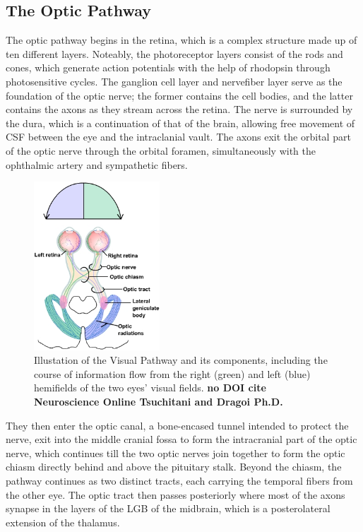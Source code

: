 \subsection{The Optic Pathway}

The optic pathway begins in the retina, which is a complex structure made up of ten different layers. Noteably, the photoreceptor layers consist of the rods and cones, which generate action potentials with the help of rhodopsin through photosensitive cycles. The ganglion cell layer and nervefiber layer serve as the foundation of the optic nerve; the former contains the cell bodies, and the latter contains the axons as they stream across the retina. The nerve is surrounded by the dura, which is a continuation of that of the brain, allowing free movement of \gls{CSF} between the eye and the intraclanial vault. The axons exit the orbital part of the optic nerve through the orbital foramen, simultaneously with the ophthalmic artery and sympathetic fibers.

\clearpage %

\begin{figure}
	\centering
	\includegraphics[width = 0.42\textwidth]{assets/images/Optic_Pathway.jpg}
	\caption{Illustation of the Visual Pathway and its components, including the course of information flow from the right (green) and left (blue) hemifields of the two eyes' visual fields. \textbf{no DOI cite Neuroscience Online Tsuchitani and Dragoi Ph.D.}}
	\label{fig:OpticPath}
\end{figure}

They then enter the optic canal, a bone-encased tunnel intended to protect the nerve, exit into the middle cranial fossa to form the intracranial part of the optic nerve, which continues till the two optic nerves join together to form the optic chiasm directly behind and above the pituitary stalk. Beyond the chiasm, the pathway continues as two distinct tracts, each carrying the temporal fibers from the other eye. The optic tract then passes posteriorly where most of the axons synapse in the layers of the \gls{LGB} of the midbrain, which is a posterolateral extension of the thalamus.


